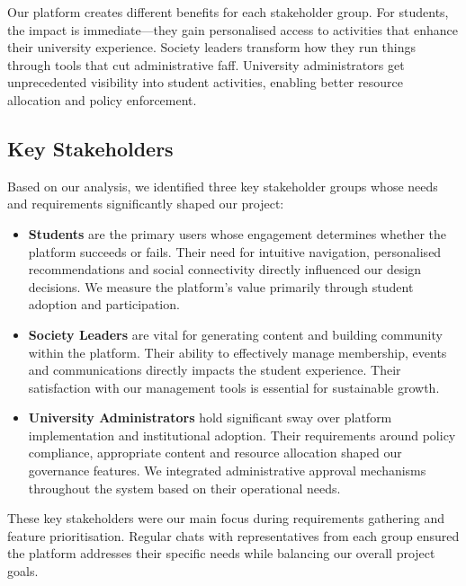 Our platform creates different benefits for each stakeholder group. For students, the impact is immediate—they gain personalised access to activities that enhance their university experience. Society leaders transform how they run things through tools that cut administrative faff. University administrators get unprecedented visibility into student activities, enabling better resource allocation and policy enforcement.

\subsection{Key Stakeholders}

Based on our analysis, we identified three key stakeholder groups whose needs and requirements significantly shaped our project:

\begin{itemize}
    \item \textbf{Students} are the primary users whose engagement determines whether the platform succeeds or fails. Their need for intuitive navigation, personalised recommendations and social connectivity directly influenced our design decisions. We measure the platform's value primarily through student adoption and participation.
    
    \item \textbf{Society Leaders} are vital for generating content and building community within the platform. Their ability to effectively manage membership, events and communications directly impacts the student experience. Their satisfaction with our management tools is essential for sustainable growth.
    
    \item \textbf{University Administrators} hold significant sway over platform implementation and institutional adoption. Their requirements around policy compliance, appropriate content and resource allocation shaped our governance features. We integrated administrative approval mechanisms throughout the system based on their operational needs.
\end{itemize}

These key stakeholders were our main focus during requirements gathering and feature prioritisation. Regular chats with representatives from each group ensured the platform addresses their specific needs while balancing our overall project goals.